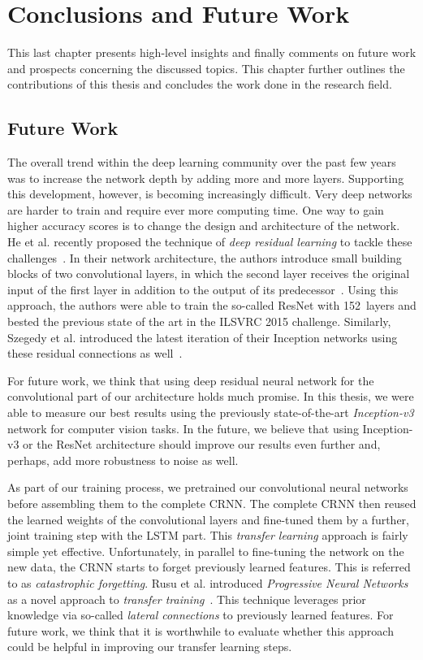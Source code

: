 \section{Conclusions and Future Work}
\label{sec:summary}
This last chapter presents high-level insights and finally comments on
future work and prospects concerning the discussed topics.
This chapter further outlines the contributions of this thesis and concludes the work done
in the research field.

\subsection{Future Work}
The overall trend within the deep learning community over the past few years was to increase the network depth by adding more and more layers. Supporting this development, however, is becoming increasingly difficult. Very deep networks are harder to train and require ever more computing time. One way to gain higher accuracy scores is to change the design and architecture of the network. He et al. recently proposed the technique of \emph{deep residual learning} to tackle these challenges~\cite{he2016deep}. In their network architecture, the authors introduce small building blocks of two convolutional layers, in which the second layer receives the original input of the first layer in addition to the output of its predecessor~\cite{he2016deep}. Using this approach, the authors were able to train the so-called ResNet with \num{152}~layers and bested the previous state of the art in the ILSVRC 2015 challenge. Similarly, Szegedy et al. introduced the latest iteration of their Inception networks using these residual connections as well~\cite{szegedy2016inception}.

For future work, we think that using deep residual neural network for the convolutional part of our architecture holds much promise. In this thesis, we were able to measure our best results using the previously state-of-the-art \emph{Inception-v3} network for computer vision tasks. In the future, we believe that using Inception-v3 or the ResNet architecture should improve our results even further and, perhaps, add more robustness to noise as well.

As part of our training process, we pretrained our convolutional neural networks before assembling them to the complete CRNN. The complete CRNN then reused the learned weights of the convolutional layers and fine-tuned them by a further, joint training step with the LSTM part. This \emph{transfer learning} approach is fairly simple yet effective. Unfortunately, in parallel to fine-tuning the network on the new data, the CRNN starts to forget previously learned features. This is referred to as \emph{catastrophic forgetting}. Rusu et al. introduced \emph{Progressive Neural Networks} as a novel approach to \emph{transfer training}~\cite{rusu2016progressive}. This technique leverages prior knowledge via so-called \emph{lateral connections} to previously learned features. For future work, we think that it is worthwhile to evaluate whether this approach could be helpful in improving our transfer learning steps.

